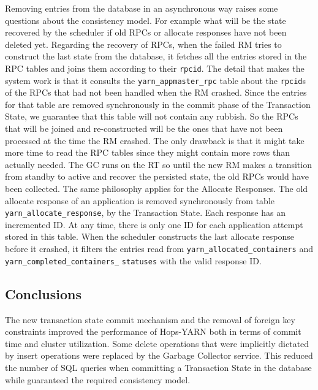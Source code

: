 Removing entries from the database in an asynchronous way raises some
questions about the consistency model. For example what will be the
state recovered by the scheduler if old RPCs or allocate responses
have not been deleted yet. Regarding the recovery of RPCs, when the
failed RM tries to construct the last state from the database, it
fetches all the entries stored in the RPC tables and joins them
according to their \texttt{rpcid}. The detail that makes the system work is that it consults the
\texttt{yarn\_appmaster\_rpc} table about the \texttt{rpcid}s of the
RPCs that had not been handled when the RM crashed. Since the entries
for that table are removed synchronously in the commit phase of the
Transaction State, we guarantee that this table will not contain any
rubbish. So the RPCs that will be joined and re-constructed will be
the ones that have not been processed at the time the RM crashed.
The only drawback is that it might take more
time to read the RPC tables since they might contain more rows than
actually needed. The GC runs on the RT so until the new
RM makes a transition from standby to active and recover the persisted
state, the old RPCs would have been collected. The same philosophy
applies for the Allocate Responses. The old allocate response of an
application is removed synchronously from table
\texttt{yarn\_allocate\_response}, by the Transaction State. Each
response has an incremented ID. At any time, there is only one ID for
each application attempt stored in this table. When the scheduler
constructs the last allocate response before it crashed, it filters
the entries read from \texttt{yarn\_allocated\_containers} and
\texttt{yarn\_completed\_containers\_} \texttt{statuses} with the valid response
ID.

\subsection{Conclusions}
\label{ssec:impl_gc_service_conclusions}
The new transaction state commit mechanism and the removal of foreign
key constraints improved the performance of Hops-YARN both in terms of
commit time and cluster utilization. Some delete operations that were
implicitly dictated by insert operations were replaced by the Garbage
Collector service. This reduced the number of SQL queries when committing a
Transaction State in the database while guaranteed the required
consistency model.
